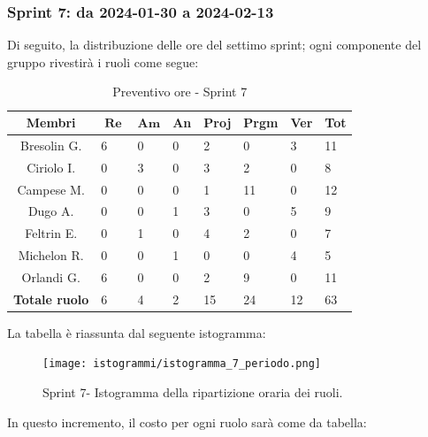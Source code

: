 \documentclass[10pt, a4paper]{article}
\begin{document}
{{{{{{{{{{{{{{\subsubsection{Sprint 7: da 2024-01-30 a 2024-02-13}
Di seguito, la distribuzione delle ore del settimo sprint; ogni componente del gruppo rivestirà i ruoli come segue:
\begin{table}[H]
\begin{tabularx}{\textwidth}{c|X|X|X|X|X|X|X}
        \textbf{Membri} & $\operatorname{\textbf{Re}}$ & $\mathrm{\textbf{Am}}$ & \textbf{An} & \textbf{Proj} & \textbf{Prgm} & \textbf{Ver} & \textbf{Tot} \\
        \hline Bresolin G. & \cellcolor{primarycolor}6 & 0 & 0 & 2 & 0 & 3 & 11 \\
        \hline Ciriolo I.  & 0 & \cellcolor{primarycolor}3 & 0 & 3 & 2 & 0 & 8 \\
        \hline Campese M.  & 0 & 0 & 0 & 1 & \cellcolor{primarycolor}11 & 0 & 12 \\
        \hline Dugo A.     & 0 & 0 & 1 & 3 & 0 & \cellcolor{primarycolor}5 & 9 \\
        \hline Feltrin E.  & 0 & 1 & 0 & \cellcolor{primarycolor}4 & 2 & 0 & 7 \\
        \hline Michelon R. & 0 & 0 & 1 & 0 & 0 & \cellcolor{primarycolor}4 & 5 \\
        \hline Orlandi G.  & 6 & 0 & 0 & 2 & \cellcolor{primarycolor}9 & 0 & 11 \\
        \hline
        \textbf{Totale ruolo} & 6 & 4 & 2 & 15 & 24 & 12 & 63 
    \end{tabularx}
    \caption{Preventivo ore - Sprint 7}
    \end{table}

La tabella è riassunta dal seguente istogramma:
 \begin{figure}[H]
        \centering        
        \texttt{[image: istogrammi/istogramma\_7\_periodo.png]}
        \caption{Sprint 7- Istogramma della ripartizione oraria dei ruoli. }
    \end{figure}

In questo incremento, il costo per ogni ruolo sarà come da tabella:
{\renewcommand{\arraystretch}{1.5}
\begin{table}[H]
\centering
\begin{tabularx}{0.42\textwidth}{c|c|c}


\end{tabularx}
\end{table}}}}}}}}}}}}}}}}
\end{document}
